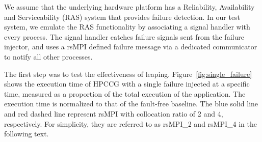 We assume that the underlying hardware platform has a Reliability, Availability and Serviceability (RAS) system that provides failure detection. In our test system, we emulate the RAS functionality by associating a signal handler with every process. The signal handler catches failure signals sent from the failure injector, and uses a rsMPI defined failure message via a dedicated communicator to notify all other processes.%

The first step was to test the effectiveness of leaping. %
Figure~\ref{fig:single_failure} shows the execution time of HPCCG with a single failure injected at a specific time, measured as a proportion of the total execution of the application. %
The execution time is normalized to that of the fault-free baseline.   
The blue solid line and red dashed line represent rsMPI with collocation ratio of 2 and 4, respectively. For simplicity, they are referred to as rsMPI\_2 and rsMPI\_4 in the following text.  

